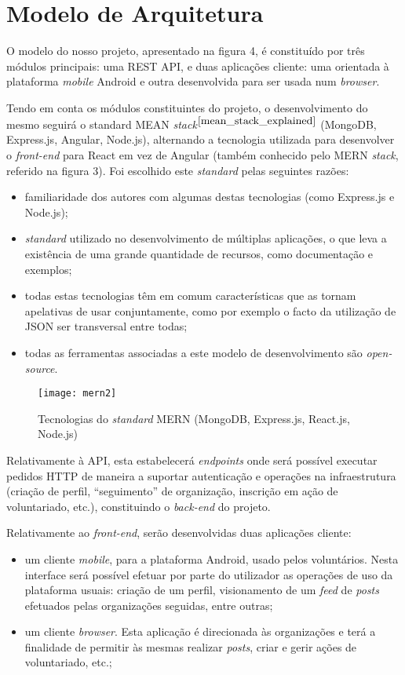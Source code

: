 \section{Modelo de Arquitetura} 
O modelo do nosso projeto, apresentado na figura 4, é constituído por três módulos principais: uma REST API, e duas aplicações cliente: uma orientada à plataforma \textit{mobile} Android e outra desenvolvida para ser usada num \textit{browser}. \par \medskip

Tendo em conta os módulos constituintes do projeto, o desenvolvimento do mesmo seguirá o standard MEAN \textit{stack}$^{\cite{mean_stack_explained}}$ (MongoDB, Express.js, Angular, Node.js), alternando a tecnologia utilizada para desenvolver o \textit{front-end} para React em vez de Angular (também conhecido pelo MERN \textit{stack}, referido na figura 3). Foi escolhido este \textit{standard} pelas seguintes razões:
\begin{itemize}
	\item familiaridade dos autores com algumas destas tecnologias (como Express.js e Node.js);
	\item \textit{standard} utilizado no desenvolvimento de múltiplas aplicações, o que leva a existência de uma grande quantidade de recursos, como documentação e exemplos;
	\item todas estas tecnologias têm em comum características que as tornam apelativas de usar conjuntamente, como por exemplo o facto da utilização de JSON ser transversal entre todas;
	\item todas as ferramentas associadas a este modelo de desenvolvimento são \textit{open-source}.
\end{itemize}

\begin{figure}[h]
	\centering
	\texttt{[image: mern2]}
	\caption{Tecnologias do \textit{standard} MERN (MongoDB, Express.js, React.js, Node.js)}
\end{figure}

Relativamente à API, esta estabelecerá \textit{endpoints} onde será possível executar pedidos HTTP de maneira a suportar autenticação e operações na infraestrutura (criação de perfil, “seguimento” de organização, inscrição em ação de voluntariado, etc.), constituindo o \textit{back-end} do projeto.
\par \medskip

\newpage 

Relativamente ao \textit{front-end}, serão desenvolvidas duas aplicações cliente: 
\begin{itemize}
	\item um cliente \textit{mobile}, para a plataforma Android, usado pelos voluntários. Nesta interface será possível efetuar por parte do utilizador as operações de uso da plataforma usuais: criação de um perfil, visionamento de um \textit{feed} de \textit{posts} efetuados pelas organizações seguidas, entre outras;
	\item um cliente \textit{browser}. Esta aplicação é direcionada às organizações e terá a finalidade de permitir às mesmas realizar \textit{posts}, criar e gerir ações de voluntariado, etc.;
\end{itemize}

